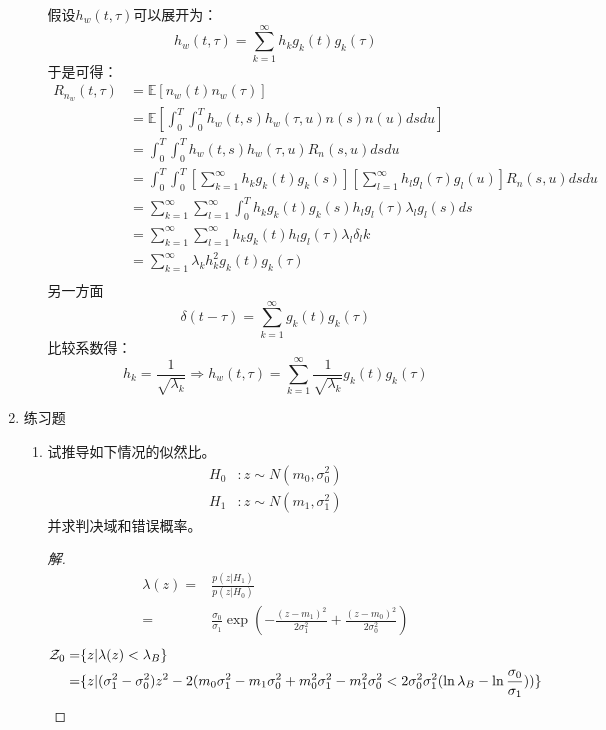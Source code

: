 \documentclass{article}
\def\E{\mathbb{E}}
\begin{document}
\begin{enumerate}
\begin{enumerate}[label=(\alph*)]
假设$h_w(t,\tau)$可以展开为：
$$
h_w(t,\tau) = \sum_{k=1}^{\infty} h_k g_k(t) g_k(\tau)
$$
于是可得：
\begin{align*}
R_{n_w}(t,\tau) & = \E[n_w(t)n_w(\tau)]\\
                & = \E\left[\int_0^T\int_0^T h_w(t,s)h_w(\tau,u)n(s)n(u)dsdu\right]\\
                & = \int_0^T\int_0^T h_w(t,s)h_w(\tau,u)R_n(s,u)dsdu \\
                & = \int_0^T\int_0^T \left[\sum_{k=1}^{\infty} h_k g_k(t) g_k(s)\right]\left[\sum_{l=1}^{\infty} h_l g_l(\tau) g_l(u)\right]R_n(s,u)dsdu \\
                & = \sum_{k=1}^{\infty}\sum_{l=1}^{\infty}\int_0^T  h_k g_k(t) g_k(s) h_l g_l(\tau) \lambda_l g_l(s)ds \\
                & = \sum_{k=1}^{\infty}\sum_{l=1}^{\infty} h_k g_k(t)  h_l g_l(\tau) \lambda_l\delta_lk \\
                & = \sum_{k=1}^{\infty} \lambda_kh^2_k g_k(t)g_k(\tau)  \\
\end{align*}
另一方面
$$
\delta(t-\tau) = \sum_{k=1}^{\infty} g_k(t)g_k(\tau)
$$
比较系数得：
\begin{equation}
h_k = \frac{1}{\sqrt{\lambda_k}} \Rightarrow h_w(t,\tau) = \sum_{k=1}^{\infty} \frac{1}{\sqrt{\lambda_k}} g_k(t)g_k(\tau)
\end{equation}
\end{enumerate}
\item 练习题
\begin{enumerate}[label=(\arabic*)]
\item 试推导如下情况的似然比。
\begin{align*}
H_0 & :  z\sim N(m_0,\sigma_0^2) \\
H_1 & :  z\sim N(m_1,\sigma_1^2)
\end{align*}
并求判决域和错误概率。
\begin{proof}[解]
\begin{align}
\lambda(z) = & \frac{p(z|H_1)}{p(z|H_0)} \\
            = & \frac{\sigma_0}{\sigma_1}\exp(-\frac{(z-m_1)^2}{2\sigma_1^2}+\frac{(z-m_0)^2}{2\sigma_0^2})\label{eq:Gaussian_likelyhood_ratio}
\end{align}
\begin{align*}
\mathcal{Z}_0 = & \{z|\lambda(z) < \lambda_B\} \\
= & \{z| (\sigma_1^2-\sigma_0^2)z^2-2(m_0\sigma_1^2-m_1\sigma_0^2 +m_0^2 \sigma_1^2-m_1^2\sigma_0^2<2\sigma_0^2\sigma_1^2(\ln \lambda_B - \ln {\sigma_0 \over \sigma_1})) \}\\

\end{align*}
\end{proof}
\end{enumerate}
\end{enumerate}
\end{document}
